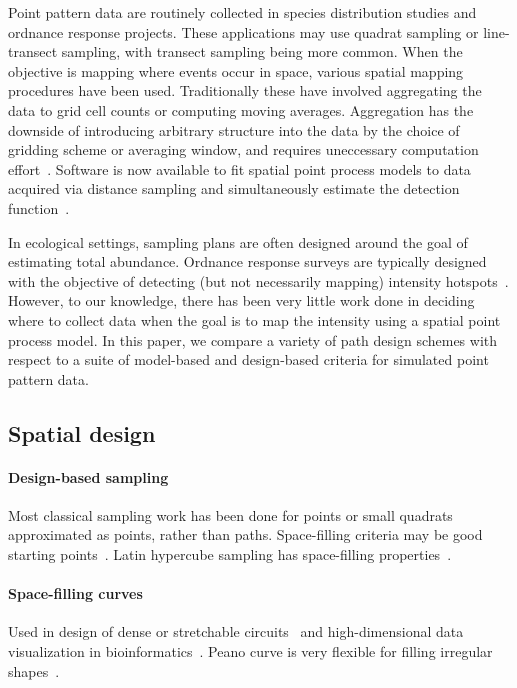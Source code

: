 \documentclass[review]{elsarticle}
\begin{document}
Point pattern data are routinely collected in species distribution studies and
ordnance response projects. These applications may use quadrat sampling or
line-transect sampling, with transect sampling being more common. When the
objective is mapping where events occur in space, various spatial mapping
procedures have been used. Traditionally these have involved aggregating the
data to grid cell counts or computing moving averages. Aggregation has the
downside of introducing arbitrary structure into the data by the choice of
gridding scheme or averaging window, and requires uneccessary computation
effort~\citep{simpsonetal}. Software is now available to fit spatial point
process models to data acquired via distance sampling and simultaneously
estimate the detection function~\citep{dspat,baser}.

In ecological settings, sampling plans are often designed around the goal of
estimating total abundance. Ordnance response surveys are typically designed
with the objective of detecting (but not necessarily mapping) intensity
hotspots~\citep{em200-1-15,flaggetal}. However, to our knowledge, there has
been very little work done in deciding where to collect data when the goal is
to map the intensity using a spatial point process model. In this paper, we
compare a variety of path design schemes with respect to a suite of
model-based and design-based criteria for simulated point pattern data.


\subsection{Spatial design}

\paragraph{Design-based sampling}
Most classical sampling work has been done for points or small quadrats
approximated as points,  rather than paths. Space-filling criteria may be good
starting points~\citep{borkowskipiepel}. Latin hypercube sampling has
space-filling properties~\cite{mckayetal,husslageetal}.

\paragraph{Space-filling curves}
Used in design of dense or stretchable circuits~\citep{ogorzalek,mazhang} and
high-dimensional data visualization in bioinformatics~\citep{hilbertvis}. Peano
curve is very flexible for filling irregular shapes~\citep{fanetal}.
\end{document}

